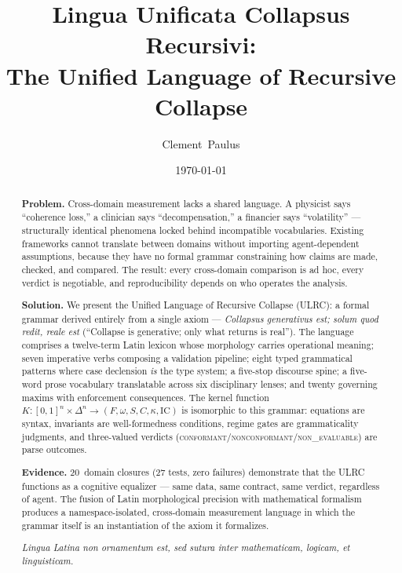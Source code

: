 \documentclass[
  aps,
  prd,
  twocolumn,
  superscriptaddress,
  nofootinbib,
  floatfix
]{revtex4-2}
\newcommand{\regime}[1]{\textrm{\upshape\scshape#1}}
\newcommand{\conform}{\regime{conformant}}
\newcommand{\nonconform}{\regime{nonconformant}}
\newcommand{\Fid}{F}
\newcommand{\Drft}{\omega}
\newcommand{\Ent}{S}
\newcommand{\Curv}{C}
\newcommand{\Logint}{\kappa}
\newcommand{\IC}{\mathrm{IC}}
\newcommand{\lat}[1]{\textit{#1}}
\begin{document}

\title{%
  \textrm{Lingua Unificata Collapsus Recursivi}:\\
  The Unified Language of Recursive Collapse%
}

\author{Clement~Paulus}

\date{\today}

\begin{abstract}
\textbf{Problem.}
Cross-domain measurement lacks a shared language. A physicist
says ``coherence loss,'' a clinician says ``decompensation,''
a financier says ``volatility'' --- structurally identical
phenomena locked behind incompatible vocabularies. Existing
frameworks cannot translate between domains without importing
agent-dependent assumptions, because they have no formal
grammar constraining how claims are made, checked, and compared.
The result: every cross-domain comparison is ad hoc, every
verdict is negotiable, and reproducibility depends on who
operates the analysis.

\textbf{Solution.}
We present the Unified Language of Recursive Collapse (ULRC):
a formal grammar derived entirely from a single axiom ---
\lat{Collapsus generativus est; solum quod redit, reale est}
(``Collapse is generative; only what returns is real'').
The language comprises a twelve-term Latin lexicon whose
morphology carries operational meaning; seven imperative
verbs composing a validation pipeline; eight typed
grammatical patterns where case declension \emph{is} the
type system; a five-stop discourse spine; a five-word prose
vocabulary translatable across six disciplinary lenses; and
twenty governing maxims with enforcement consequences. The
kernel function $K\!:\![0,1]^n \times \Delta^n \to
(\Fid,\Drft,\Ent,\Curv,\Logint,\IC)$ is isomorphic to
this grammar: equations are syntax, invariants are
well-formedness conditions, regime gates are grammaticality
judgments, and three-valued verdicts
(\conform/\nonconform/\regime{non\_evaluable}) are parse
outcomes.

\textbf{Evidence.}
20~domain closures (27 tests, zero failures) demonstrate
that the ULRC functions as a cognitive equalizer --- same data,
same contract, same verdict, regardless of agent. The fusion
of Latin morphological precision with mathematical formalism
produces a namespace-isolated, cross-domain measurement
language in which the grammar itself is an instantiation of
the axiom it formalizes.

\vspace{4pt}
\noindent\lat{Lingua Latina non ornamentum est, sed sutura
  inter mathematicam, logicam, et linguisticam.}
\end{abstract}
\end{document}
